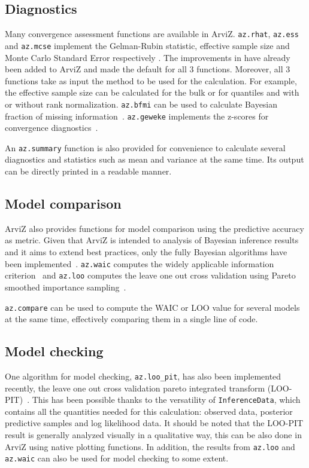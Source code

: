 \documentclass[anonymous=false, %
               format=acmsmall, %
               review=true, %
               screen=true, %
               nonacm=true]{acmart}
\begin{document}
\subsection{Diagnostics}
Many convergence assessment functions are available in ArviZ.
\texttt{az.rhat}, \texttt{az.ess} and \texttt{az.mcse}
implement the Gelman-Rubin statistic, effective sample size and Monte Carlo
Standard Error respectively \cite{gelman1992rhat, gelman2013bayesian}. %
The improvements in \citet{vehtari2019rank} have already been added to
ArviZ and made the default for all 3 functions. Moreover, all 3 functions take
as input the method to be used for the calculation. For example, the effective
sample size can be calculated for the bulk or for quantiles and with or without
rank normalization. \texttt{az.bfmi} can be used to calculate Bayesian fraction
of missing information~\cite{betancourt2016diagnosing}. \texttt{az.geweke}
implements the z-scores for convergence diagnostics~\cite{geweke1991evaluating}.

An \texttt{az.summary} function is also provided for convenience to calculate
several diagnostics and statistics such as mean and variance at the same time.
Its output can be directly printed in a readable manner.

\subsection{Model comparison}
ArviZ also provides functions for model comparison using the predictive
accuracy as metric. Given that ArviZ is intended to analysis of Bayesian
inference results and it aims to extend best practices, only the fully
Bayesian algorithms have been implemented~\cite{gelman2014understanding}.
\texttt{az.waic} computes the
widely applicable information criterion~\cite{watanabe2010waic} and
\texttt{az.loo} computes the leave one out cross validation using Pareto
smoothed importance sampling~\cite{vehtari2015pareto, vehtari2017practical}.

\texttt{az.compare} can be used to compute the WAIC or LOO value for several
models at the same time, effectively comparing them in a single line of code.

\subsection{Model checking}
One algorithm for model checking, \texttt{az.loo\_pit}, has also been implemented
recently, the leave
one out cross validation pareto integrated transform
(LOO-PIT)~\cite{gabry2019visualization}. This has been possible thanks to the
versatility of \texttt{InferenceData}, which contains all the quantities
needed for this calculation: observed data, posterior predictive samples and
log likelihood data. It should be noted that the LOO-PIT result is generally
analyzed visually in a qualitative way, this can be also done in ArviZ using
native plotting functions. In addition, the results from \texttt{az.loo} and
\texttt{az.waic} can also be used for model checking to some extent.
\end{document}
